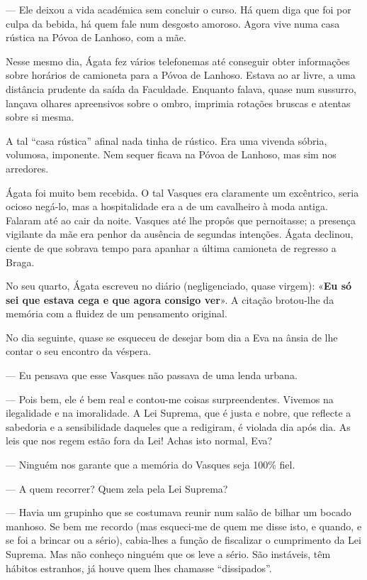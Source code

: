 --- Ele deixou a vida académica sem concluir o curso. Há quem diga que
foi por culpa da bebida, há quem fale num desgosto amoroso. Agora
vive numa casa rústica na Póvoa de Lanhoso, com a mãe.

Nesse mesmo dia, Ágata fez vários telefonemas até conseguir obter
informações sobre horários de camioneta para a Póvoa de Lanhoso. Estava
ao ar livre, a uma distância prudente da saída da Faculdade. Enquanto
falava, quase num sussurro, lançava olhares apreensivos sobre o ombro,
imprimia rotações bruscas e atentas sobre si mesma.

A tal ``casa rústica'' afinal nada tinha de rústico. Era uma vivenda
sóbria, volumosa, imponente. Nem sequer ficava na Póvoa de Lanhoso, mas
sim nos arredores.

Ágata foi muito bem recebida. O tal Vasques era claramente um
excêntrico, seria ocioso negá-lo, mas a hospitalidade era a de um
cavalheiro à moda antiga. Falaram até ao cair da noite. Vasques até lhe
propôs que pernoitasse; a presença vigilante da mãe era penhor da
ausência de segundas intenções. Ágata declinou, ciente de que sobrava
tempo para apanhar a última camioneta de regresso a Braga.

No seu quarto, Ágata escreveu no diário (negligenciado, quase virgem):
«\textbf{Eu só sei que estava cega e que agora consigo ver}». A
citação brotou-lhe da memória com a fluidez de um pensamento original.

No dia seguinte, quase se esqueceu de desejar bom dia a Eva na ânsia de
lhe contar o seu encontro da véspera.

--- Eu pensava que esse Vasques não passava de uma lenda urbana.

--- Pois bem, ele é bem real e contou-me coisas surpreendentes.
Vivemos na ilegalidade e na imoralidade. A Lei Suprema, que é justa
e nobre, que reflecte a sabedoria e a sensibilidade daqueles que a
redigiram, é violada dia após dia. As leis que
nos regem estão fora da Lei! Achas isto normal, Eva?

--- Ninguém nos garante que a memória do Vasques seja 100\% fiel.

--- A quem recorrer? Quem zela pela Lei Suprema?

--- Havia um grupinho que se costumava reunir num salão de bilhar um
  bocado manhoso. Se bem me recordo (mas esqueci-me de quem me disse
  isto, e quando, e se foi a brincar ou a sério), cabia-lhes a função de
  fiscalizar o cumprimento da Lei Suprema. Mas não conheço ninguém que
  os leve a sério. São instáveis, têm hábitos estranhos, já houve quem
  lhes chamasse ``dissipados''.

